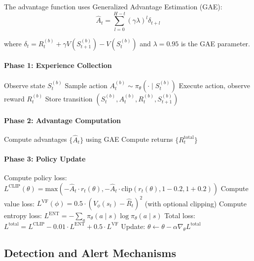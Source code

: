 \documentclass[12pt,oneside]{article}
\begin{document}
The advantage function uses Generalized Advantage Estimation (GAE):
\begin{equation}
\hat{A}_t = \sum_{l=0}^{H-t} (\gamma \lambda)^l \delta_{t+l}
\end{equation}

where $\delta_t = R_t^{(b)} + \gamma V(S_{t+1}^{(b)}) - V(S_t^{(b)})$ and $\lambda = 0.95$ is the GAE parameter.

\begin{algorithm}
\caption{PPO Training for Blue Agent}
\begin{algorithmic}[1]
\STATE \paragraph{Phase 1: Experience Collection}
        \STATE Observe state $S_t^{(b)}$
        \STATE Sample action $A_t^{(b)} \sim \pi_\theta(\cdot \mid S_t^{(b)})$
        \STATE Execute action, observe reward $R_t^{(b)}$
        \STATE Store transition $(S_t^{(b)}, A_t^{(b)}, R_t^{(b)}, S_{t+1}^{(b)})$
    \ENDFOR
\ENDFOR
\STATE \paragraph{Phase 2: Advantage Computation}
\STATE Compute advantages $\{\hat{A}_t\}$ using GAE
\STATE Compute returns $\{R_t^{\text{total}}\}$
\STATE \paragraph{Phase 3: Policy Update}
        \STATE Compute policy loss: $L^{\text{CLIP}}(\theta) = \text{max}(-\hat{A}_t \cdot r_t(\theta), -\hat{A}_t \cdot \text{clip}(r_t(\theta), 1-0.2, 1+0.2))$
        \STATE Compute value loss: $L^{\text{VF}}(\phi) = 0.5 \cdot (V_\phi(s_t) - \hat{R}_t)^2$ (with optional clipping)
        \STATE Compute entropy loss: $L^{\text{ENT}} = -\sum_a \pi_\theta(a \mid s) \log \pi_\theta(a \mid s)$
        \STATE Total loss: $L^{\text{total}} = L^{\text{CLIP}} - 0.01 \cdot L^{\text{ENT}} + 0.5 \cdot L^{\text{VF}}$
        \STATE Update: $\theta \leftarrow \theta - \alpha \nabla_\theta L^{\text{total}}$
    \ENDFOR
\ENDFOR
\end{algorithmic}
\end{algorithm}

\subsection{Detection and Alert Mechanisms}
\end{document}
